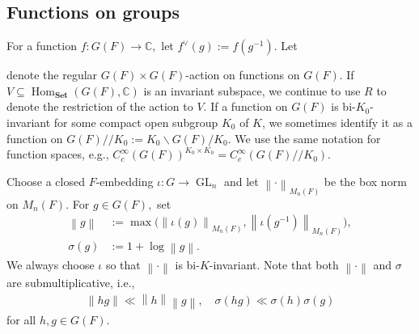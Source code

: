 \documentclass[10pt]{amsart}
\newcommand{\norm}[1]{\left\lVert#1\right\rVert} %
\theoremstyle{definition}
\numberwithin{equation}{section}
\DeclareMathOperator{\Hom}{\mathrm{Hom}}
\DeclareMathOperator{\GL}{\mathrm{GL}}
\numberwithin{equation}{subsection}
\newcommand{\CC}{\mathbb{C}}
\begin{document}
\subsection{Functions on groups} 
For a function $f:G(F)\to \CC,$ let $f^\lor(g):=f(g^{-1}).$ Let
\begin{center}
\end{center}
denote the regular $G(F)\times G(F)$-action on functions on $G(F)$. If $V\subseteq \Hom_{\textbf{Set}}(G(F),\mathbb{C})$ is an invariant subspace, we continue to use $R$ to denote the restriction of the action to $V$. If a function on $G(F)$ is bi-$K_0$-invariant for some compact open subgroup $K_0$ of $K$, we sometimes identify it as a function on $G(F)/\!/K_0:=K_0\backslash G(F)/K_0$. We use the same notation for function spaces, e.g., $C^\infty_c(G(F))^{K_0\times K_0}=C^\infty_c(G(F)/\!/K_0).$

Choose a closed $F$-embedding $\iota:G\to \GL_n$ and let $\norm{\cdot}_{M_n(F)}$ be the box norm on $M_n(F)$. For $g\in G(F),$ set
\begin{align*}
    \norm{g}&:= \max\big(\norm{\iota(g)}_{M_n(F)},\norm{\iota(g^{-1})}_{M_n(F)}\big),\\
    \sigma(g)&:= 1+\log \norm{g}.
\end{align*}
We always choose $\iota$ so that $\norm{\cdot}$ is bi-$K$-invariant. Note that both $\norm{\cdot}$ and $\sigma$ are submultiplicative, i.e.,
\begin{align*}
    \norm{hg}\ll \norm{h}\norm{g},\quad \sigma(hg)\ll \sigma(h)\sigma(g)
\end{align*}
for all $h,g\in G(F)$.
\end{document}
